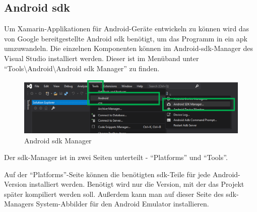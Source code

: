 \subsection{Android \acs{sdk}}
Um Xamarin-Applikationen für Android-Geräte entwickeln zu können wird das von Google bereitgestellte Android \ac{sdk} benötigt, um das Programm in ein \ac{apk} umzuwandeln. Die einzelnen Komponenten können im Android-\ac{sdk}-Manager des Visual Studio installiert werden.
Dieser ist im Menüband unter \enquote{Tools\textbackslash Android\textbackslash Android \ac{sdk} Manager} zu finden.
\begin{figure}[H]
    \centering\includegraphics[width=0.9\linewidth]{images/auswahl_rahmenwerk/android_sdk_installation.png}    
    \caption{Android \acs{sdk} Manager}
\end{figure}
Der \ac{sdk}-Manager ist in zwei Seiten unterteilt - \enquote{Platforms} und \enquote{Tools}.\par

Auf der \enquote{Plat\-forms}-Seite können die benötigten \ac{sdk}-Teile für jede Android-Version installiert werden.
Benötigt wird nur die Version, mit der das Projekt später kompiliert werden soll.
Außerdem kann man auf dieser Seite des \ac{sdk}-Managers System-Abbilder für den Android Emulator installieren.\par

